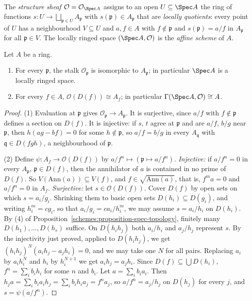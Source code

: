 \begin{definition}\label{schemes:definition-structure-sheaf}
The \emph{structure sheaf} $\mathcal{O} = \mathcal{O}_{\Spec A}$ assigns to an open $U \subseteq \Spec A$ the ring of functions
$s \colon U \to \bigsqcup_{\mathfrak{p} \in U}A_\mathfrak{p}$ with $s(\mathfrak{p}) \in A_\mathfrak{p}$ that are \emph{locally quotients}: every point of $U$ has a
neighbourhood $V \subseteq U$ and $a, f \in A$ with $f \notin \mathfrak{p}$ and $s(\mathfrak{p}) = a/f$ in $A_\mathfrak{p}$ for all $\mathfrak{p} \in V$. The
locally ringed space $(\Spec A, \mathcal{O})$ is the \emph{affine scheme} of $A$.
\end{definition}

\begin{theorem}\label{schemes:theorem-structure-sheaf}
Let $A$ be a ring.
\begin{enumerate}
\item For every $\mathfrak{p}$, the stalk $\mathcal{O}_\mathfrak{p}$ is isomorphic to $A_\mathfrak{p}$; in particular $\Spec A$ is a locally ringed space.
\item For every $f \in A$, $\mathcal{O}(D(f)) \cong A_f$; in particular $\Gamma(\Spec A, \mathcal{O}) \cong A$.
\end{enumerate}
\end{theorem}

\begin{proof}
(1) Evaluation at $\mathfrak{p}$ gives $\mathcal{O}_\mathfrak{p} \to A_\mathfrak{p}$. It is surjective, since $a/f$ with $f \notin \mathfrak{p}$ defines a section on
$D(f)$. It is injective: if $s$, $t$ agree at $\mathfrak{p}$ and are $a/f$, $b/g$ near $\mathfrak{p}$, then $h(ag - bf) = 0$ for some $h \notin \mathfrak{p}$, so
$a/f = b/g$ in every $A_\mathfrak{q}$ with $\mathfrak{q} \in D(fgh)$, a neighbourhood of $\mathfrak{p}$.

(2) Define $\psi \colon A_f \to \mathcal{O}(D(f))$ by $a/f^n \mapsto (\mathfrak{p} \mapsto a/f^n)$. \emph{Injective:} if $a/f^n = 0$ in every $A_\mathfrak{p}$,
$\mathfrak{p} \in D(f)$, then the annihilator of $a$ is contained in no prime of $D(f)$. So $V(\mathrm{Ann}(a)) \subseteq V(f)$, and $f \in \sqrt{\mathrm{Ann}(a)}$,
that is, $f^ma = 0$ and $a/f^n = 0$ in $A_f$. \emph{Surjective:} let $s \in \mathcal{O}(D(f))$. Cover $D(f)$ by open sets on which $s = a_i/g_i$. Shrinking
them to basic open sets $D(h_i) \subseteq D(g_i)$, and writing $h_i^m = cg_i$, so that $a_i/g_i = ca_i/h_i^m$, we may assume $s = a_i/h_i$ on $D(h_i)$. By
(4) of Proposition~\ref{schemes:proposition-spec-topology}, finitely many $D(h_1), \ldots, D(h_r)$ suffice. On $D(h_ih_j)$ both $a_i/h_i$ and $a_j/h_j$
represent $s$. By the injectivity just proved, applied to $D(h_ih_j)$, we get $(h_ih_j)^N(a_ih_j - a_jh_i) = 0$, and we may take one $N$ for all pairs.
Replacing $a_i$ by $a_ih_i^N$ and $h_i$ by $h_i^{N+1}$ we get $a_ih_j = a_jh_i$. Since $D(f) \subseteq \bigcup D(h_i)$, $f^n = \sum_ib_ih_i$ for some $n$ and
$b_i$. Let $a = \sum_ib_ia_i$. Then $h_ja = \sum_ib_ia_ih_j = \sum_ib_ih_ia_j = f^na_j$, so $a/f^n = a_j/h_j$ on $D(h_j)$ for every $j$, and $s = \psi(a/f^n)$.
\end{proof}

